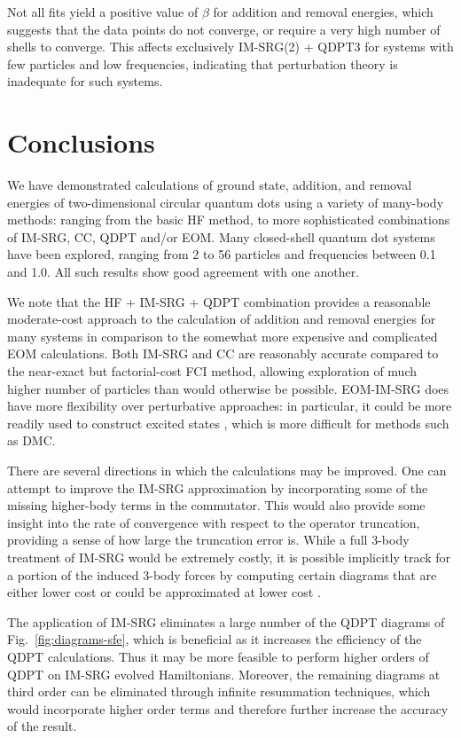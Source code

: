 Not all fits yield a positive value of $\beta$ for addition and removal energies, which suggests that the data points do not converge, or require a very high number of shells to converge.  This affects exclusively IM-SRG(2) + QDPT3 for systems with few particles and low frequencies, indicating that perturbation theory is inadequate for such systems.

\section{Conclusions}
\label{sec:conclusions}

We have demonstrated calculations of ground state, addition, and removal energies of two-dimensional circular quantum dots using a variety of many-body methods: ranging from the basic HF method, to more sophisticated combinations of IM-SRG, CC, QDPT and/or EOM.  Many closed-shell quantum dot systems have been explored, ranging from 2 to 56 particles and frequencies between 0.1 and 1.0.  All such results show good agreement with one another.

We note that the HF + IM-SRG + QDPT combination provides a reasonable moderate-cost approach to the calculation of addition and removal energies for many systems in comparison to the somewhat more expensive and complicated EOM calculations.  Both IM-SRG and CC are reasonably accurate compared to the near-exact but factorial-cost FCI method, allowing exploration of much higher number of particles than would otherwise be possible.  EOM-IM-SRG does have more flexibility over perturbative approaches: in particular, it could be more readily used to construct excited states \cite{2016arXiv161100661P}, which is more difficult for methods such as DMC.

There are several directions in which the calculations may be improved.  One can attempt to improve the IM-SRG approximation by incorporating some of the missing higher-body terms in the commutator.  This would also provide some insight into the rate of convergence with respect to the operator truncation, providing a sense of how large the truncation error is.  While a full 3-body treatment of IM-SRG would be extremely costly, it is possible implicitly track for a portion of the induced 3-body forces by computing certain diagrams that are either lower cost or could be approximated at lower cost \cite{IMSRG}.

The application of IM-SRG eliminates a large number of the QDPT diagrams of Fig.\ \ref{fig:diagrams-sfe}, which is beneficial as it increases the efficiency of the QDPT calculations.  Thus it may be more feasible to perform higher orders of QDPT on IM-SRG evolved Hamiltonians.  Moreover, the remaining diagrams at third order can be eliminated through infinite resummation techniques, which would incorporate higher order terms and therefore further increase the accuracy of the result.

